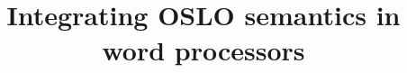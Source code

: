 \documentclass[manuscript]{acmart}
\begin{document}
\title{Integrating OSLO semantics in word processors}


  
%
%  


\renewcommand{\shortauthors}{Dwight Van Lancker et al.}
\end{document}
